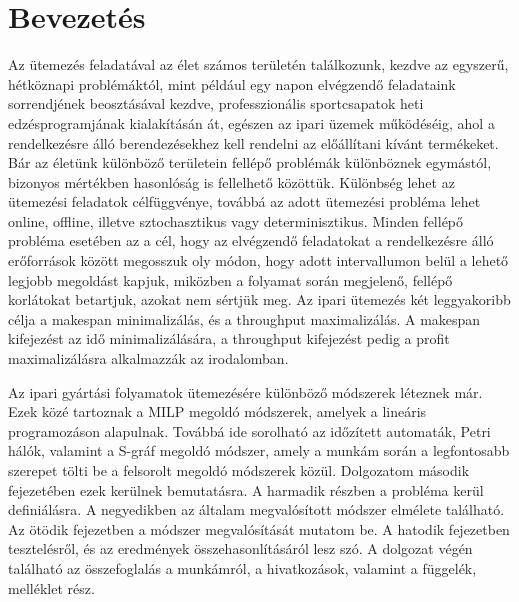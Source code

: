 \chapter{Bevezetés}
Az ütemezés feladatával az élet számos területén találkozunk, kezdve az egyszerű, hétköznapi problémáktól, mint például egy napon elvégzendő feladataink sorrendjének beosztásával kezdve, professzionális sportcsapatok heti edzésprogramjának kialakításán át, egészen az ipari üzemek működéséig, ahol a rendelkezésre álló berendezésekhez kell rendelni az előállítani kívánt termékeket. Bár az életünk különböző területein fellépő problémák különböznek egymástól, bizonyos mértékben hasonlóság is fellelhető közöttük. Különbség lehet az ütemezési feladatok célfüggvénye, továbbá az adott ütemezési probléma lehet online, offline, illetve sztochasztikus vagy determinisztikus. Minden fellépő probléma esetében az a cél, hogy az elvégzendő feladatokat a rendelkezésre álló erőforrások között megosszuk oly módon, hogy adott intervallumon belül a lehető legjobb megoldást kapjuk, miközben a folyamat során megjelenő, fellépő korlátokat betartjuk, azokat nem sértjük meg. Az ipari ütemezés két leggyakoribb célja a makespan minimalizálás, és a throughput maximalizálás. A makespan kifejezést az idő minimalizálására, a throughput kifejezést pedig a profit maximalizálásra alkalmazzák az irodalomban.

Az ipari gyártási folyamatok ütemezésére különböző módszerek léteznek már. Ezek közé tartoznak a MILP megoldó módszerek, amelyek a lineáris programozáson alapulnak. Továbbá ide sorolható az időzített automaták, Petri hálók, valamint a S-gráf megoldó módszer, amely a munkám során a legfontosabb szerepet tölti be a felsorolt megoldó módszerek közül. Dolgozatom második fejezetében ezek kerülnek bemutatásra. A harmadik részben a probléma kerül definiálásra. A negyedikben az általam megvalósított módszer elmélete található. Az ötödik fejezetben a módszer megvalósítását mutatom be. A hatodik fejezetben tesztelésről, és az eredmények összehasonlításáról lesz szó. A dolgozat végén található az összefoglalás a munkámról, a hivatkozások, valamint a függelék, melléklet rész.